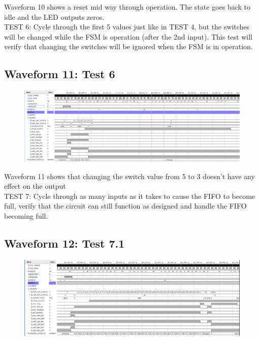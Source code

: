 \documentclass[11pt]{report}
\begin{document}
Waveform 10 shows a reset mid way through operation. The state goes back to idle and the LED outputs zeros.\\

TEST 6: Cycle through the first 5 values just like in TEST 4, but the switches will be changed while the FSM is operation
(after the 2nd input). This test will verify that changing the switches will be ignored when the FSM is in operation.

\subsection*{Waveform 11: Test 6 }
\begin{figure}[H]
       \includegraphics[width=\columnwidth]{Assets/Test6.png}
\end{figure}

Waveform 11 shows that changing the switch value from 5 to 3 doesn't have any effect on the output\\

TEST 7: Cycle through as many inputs as it takes to cause the FIFO to become full, verify that the circuit can still function
as designed and handle the FIFO becoming full.

\subsection*{Waveform 12: Test 7.1 }
\begin{figure}[H]
       \includegraphics[width=\columnwidth]{Assets/Test7_1.png}
\end{figure}
\end{document}
